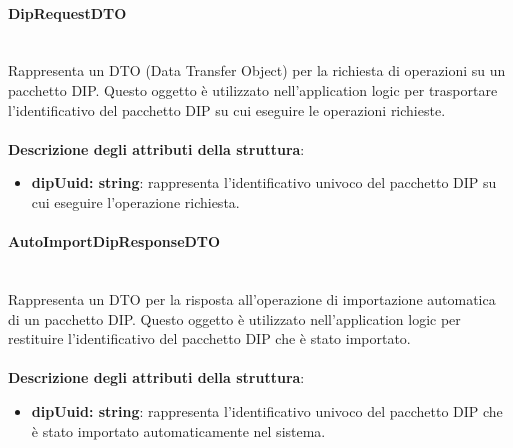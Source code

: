 \documentclass[a4paper,12pt]{article}
\begin{document}
{{{                \paragraph{DipRequestDTO}\label{par:DipRequestDTO}\mbox{}\\
                Rappresenta un DTO (Data Transfer Object) per la richiesta di operazioni su un pacchetto DIP. Questo oggetto è utilizzato nell'application logic per trasportare l'identificativo del pacchetto DIP su cui eseguire le operazioni richieste.\\
                \\
                \textbf{Descrizione degli attributi della struttura}:
                \begin{itemize}
                    \item \textbf{dipUuid: string}: rappresenta l'identificativo univoco del pacchetto DIP su cui eseguire l'operazione richiesta.
                \end{itemize}
                \paragraph{AutoImportDipResponseDTO}\label{par:AutoImportDipResponseDTO}\mbox{}\\
                Rappresenta un DTO per la risposta all'operazione di importazione automatica di un pacchetto DIP. Questo oggetto è utilizzato nell'application logic per restituire l'identificativo del pacchetto DIP che è stato importato.\\
                \\
                \textbf{Descrizione degli attributi della struttura}:
                \begin{itemize}
                    \item \textbf{dipUuid: string}: rappresenta l'identificativo univoco del pacchetto DIP che è stato importato automaticamente nel sistema.
                \end{itemize}
}}}
\end{document}
